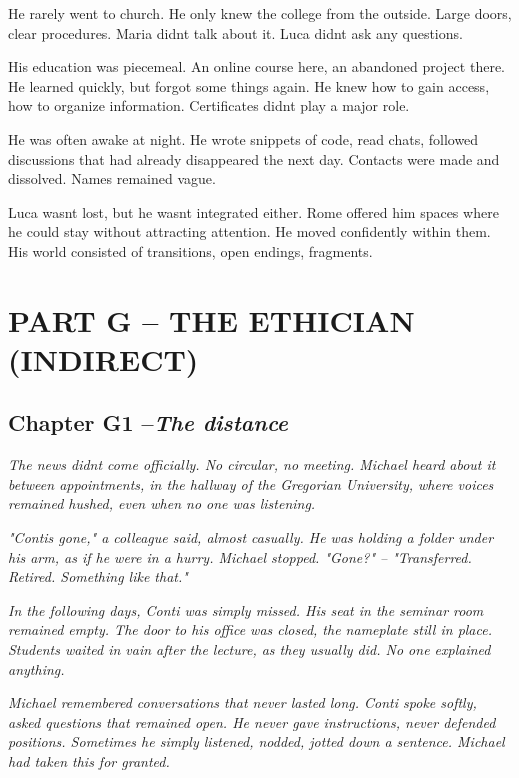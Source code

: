 \documentclass[
]{article}
\begin{document}
He rarely went to church. He only knew the college from the outside. Large doors, clear procedures. Maria didn\textquotesingle t talk about it. Luca didn\textquotesingle t ask any questions.

His education was piecemeal. An online course here, an abandoned project there. He learned quickly, but forgot some things again. He knew how to gain access, how to organize information. Certificates didn\textquotesingle t play a major role.

He was often awake at night. He wrote snippets of code, read chats, followed discussions that had already disappeared the next day. Contacts were made and dissolved. Names remained vague.

Luca wasn\textquotesingle t lost, but he wasn\textquotesingle t integrated either. Rome offered him spaces where he could stay without attracting attention. He moved confidently within them. His world consisted of transitions, open endings, fragments.

\section{PART G -- THE ETHICIAN (INDIRECT)}\label{part-g-the-ethician-indirect}

\subsection{\texorpdfstring{Chapter G1 --\emph{The distance}}{Chapter G1 --The distance}}\label{chapter-g1-the-distance}

\emph{The news didn\textquotesingle t come officially. No circular, no meeting. Michael heard about it between appointments, in the hallway of the Gregorian University, where voices remained hushed, even when no one was listening.}

\emph{"Conti\textquotesingle s gone," a colleague said, almost casually. He was holding a folder under his arm, as if he were in a hurry. Michael stopped. "Gone?" -- "Transferred. Retired. Something like that."}

\emph{In the following days, Conti was simply missed. His seat in the seminar room remained empty. The door to his office was closed, the nameplate still in place. Students waited in vain after the lecture, as they usually did. No one explained anything.}

\emph{Michael remembered conversations that never lasted long. Conti spoke softly, asked questions that remained open. He never gave instructions, never defended positions. Sometimes he simply listened, nodded, jotted down a sentence. Michael had taken this for granted.}
\end{document}
